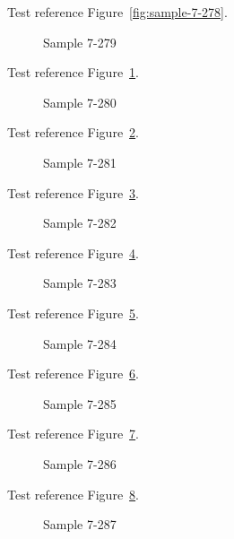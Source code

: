 Test reference Figure~\ref{fig:sample-7-278}.

\begin{figure}[tbhp]
\caption{Sample 7-279}
\label{fig:sample-7-279}
\end{figure}

Test reference Figure~\ref{fig:sample-7-279}.

\begin{figure}[tbhp]
\caption{Sample 7-280}
\label{fig:sample-7-280}
\end{figure}

Test reference Figure~\ref{fig:sample-7-280}.

\begin{figure}[tbhp]
\caption{Sample 7-281}
\label{fig:sample-7-281}
\end{figure}

Test reference Figure~\ref{fig:sample-7-281}.

\begin{figure}[tbhp]
\caption{Sample 7-282}
\label{fig:sample-7-282}
\end{figure}

Test reference Figure~\ref{fig:sample-7-282}.

\begin{figure}[tbhp]
\caption{Sample 7-283}
\label{fig:sample-7-283}
\end{figure}

Test reference Figure~\ref{fig:sample-7-283}.

\begin{figure}[tbhp]
\caption{Sample 7-284}
\label{fig:sample-7-284}
\end{figure}

Test reference Figure~\ref{fig:sample-7-284}.

\begin{figure}[tbhp]
\caption{Sample 7-285}
\label{fig:sample-7-285}
\end{figure}

Test reference Figure~\ref{fig:sample-7-285}.

\begin{figure}[tbhp]
\caption{Sample 7-286}
\label{fig:sample-7-286}
\end{figure}

Test reference Figure~\ref{fig:sample-7-286}.

\begin{figure}[tbhp]
\caption{Sample 7-287}
\label{fig:sample-7-287}
\end{figure}

